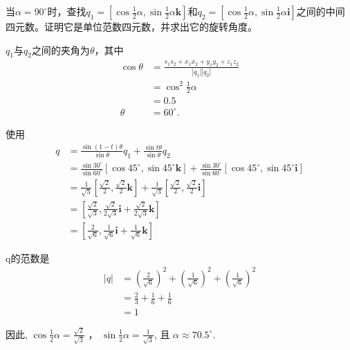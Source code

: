 \begin{example}
    当$\alpha=90^{\circ}$时，查找$q_{1}=\left[\cos \frac{1}{2} \alpha, \sin \frac{1}{2} \alpha \mathbf{k}\right]$和$q_{2}=\left[\cos \frac{1}{2} \alpha, \sin \frac{1}{2} \alpha \mathbf{i}\right]$之间的中间四元数。证明它是单位范数四元数，并求出它的旋转角度。
    
    $q_{1}$与$q_{2}$之间的夹角为$\theta$，其中
    $$
    \begin{aligned}
    \cos \theta & =\frac{s_{1} s_{2}+x_{1} x_{2}+y_{1} y_{2}+z_{1} z_{2}}{\left|q_{1}\right|\left|q_{2}\right|} \\
    & =\cos ^{2} \frac{1}{2} \alpha \\
    & =0.5 \\
    \theta & =60^{\circ} .
    \end{aligned}
    $$
    
    使用
    $$
    \begin{aligned}
    q & =\frac{\sin (1-t) \theta}{\sin \theta} q_{1}+\frac{\sin t \theta}{\sin \theta} q_{2} \\
    & =\frac{\sin 30^{\circ}}{\sin 60^{\circ}}\left[\cos 45^{\circ}, \sin 45^{\circ} \mathbf{k}\right]+\frac{\sin 30^{\circ}}{\sin 60^{\circ}}\left[\cos 45^{\circ}, \sin 45^{\circ} \mathbf{i}\right] \\
    & =\frac{1}{\sqrt{3}}\left[\frac{\sqrt{2}}{2}, \frac{\sqrt{2}}{2} \mathbf{k}\right]+\frac{1}{\sqrt{3}}\left[\frac{\sqrt{2}}{2}, \frac{\sqrt{2}}{2} \mathbf{i}\right] \\
    & =\left[\frac{\sqrt{2}}{\sqrt{3}}, \frac{\sqrt{2}}{2 \sqrt{3}} \mathbf{i}+\frac{\sqrt{2}}{2 \sqrt{3}} \mathbf{k}\right] \\
    & =\left[\frac{2}{\sqrt{6}}, \frac{1}{\sqrt{6}} \mathbf{i}+\frac{1}{\sqrt{6}} \mathbf{k}\right]
    \end{aligned}
    $$
    
    q的范数是
    $$
    \begin{aligned}
    |q| & =\left(\frac{2}{\sqrt{6}}\right)^{2}+\left(\frac{1}{\sqrt{6}}\right)^{2}+\left(\frac{1}{\sqrt{6}}\right)^{2} \\
    & =\frac{2}{3}+\frac{1}{6}+\frac{1}{6} \\
    & =1
    \end{aligned}
    $$
    
    因此, $\displaystyle\cos \frac{1}{2} \alpha=\frac{\sqrt{2}}{\sqrt{3}}$ ， $\displaystyle\sin \frac{1}{2} \alpha=\frac{1}{\sqrt{3}}$, 且 $\alpha \approx 70.5^{\circ}$.
\end{example}

